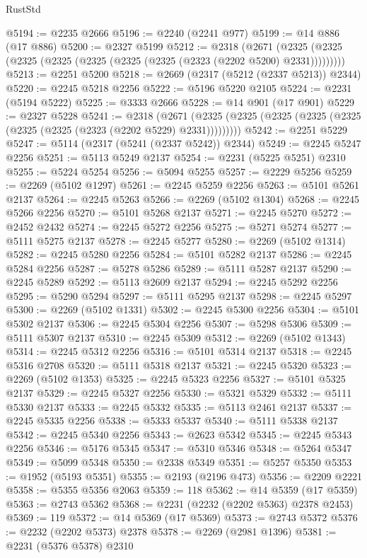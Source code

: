 \begin{lexlean}{RustStd}
\begin{coremodule}
@5194 := @2235 @2666
@5196 := @2240 (@2241 @977)
@5199 := @14 @886 (@17 @886)
@5200 := @2327 @5199
@5212 := @2318
    (@2671 (@2325 (@2325 (@2325 (@2325 (@2325 (@2325 (@2325 (@2323 (@2202 @5200) @2331)))))))))
@5213 := @2251 @5200
@5218 := @2669 (@2317 (@5212 (@2337 @5213)) @2344)
@5220 := @2245 @5218 @2256
@5222 := @5196 @5220 @2105
@5224 := @2231 (@5194 @5222)
@5225 := @3333 @2666
@5228 := @14 @901 (@17 @901)
@5229 := @2327 @5228
@5241 := @2318
    (@2671 (@2325 (@2325 (@2325 (@2325 (@2325 (@2325 (@2325 (@2323 (@2202 @5229) @2331)))))))))
@5242 := @2251 @5229
@5247 := @5114 (@2317 (@5241 (@2337 @5242)) @2344)
@5249 := @2245 @5247 @2256
@5251 := @5113 @5249 @2137
@5254 := @2231 (@5225 @5251) @2310
@5255 := @5224 @5254
@5256 := @5094 @5255
@5257 := @2229 @5256
@5259 := @2269 (@5102 @1297)
@5261 := @2245 @5259 @2256
@5263 := @5101 @5261 @2137
@5264 := @2245 @5263
@5266 := @2269 (@5102 @1304)
@5268 := @2245 @5266 @2256
@5270 := @5101 @5268 @2137
@5271 := @2245 @5270
@5272 := @2452 @2432
@5274 := @2245 @5272 @2256
@5275 := @5271 @5274
@5277 := @5111 @5275 @2137
@5278 := @2245 @5277
@5280 := @2269 (@5102 @1314)
@5282 := @2245 @5280 @2256
@5284 := @5101 @5282 @2137
@5286 := @2245 @5284 @2256
@5287 := @5278 @5286
@5289 := @5111 @5287 @2137
@5290 := @2245 @5289
@5292 := @5113 @2609 @2137
@5294 := @2245 @5292 @2256
@5295 := @5290 @5294
@5297 := @5111 @5295 @2137
@5298 := @2245 @5297
@5300 := @2269 (@5102 @1331)
@5302 := @2245 @5300 @2256
@5304 := @5101 @5302 @2137
@5306 := @2245 @5304 @2256
@5307 := @5298 @5306
@5309 := @5111 @5307 @2137
@5310 := @2245 @5309
@5312 := @2269 (@5102 @1343)
@5314 := @2245 @5312 @2256
@5316 := @5101 @5314 @2137
@5318 := @2245 @5316 @2708
@5320 := @5111 @5318 @2137
@5321 := @2245 @5320
@5323 := @2269 (@5102 @1353)
@5325 := @2245 @5323 @2256
@5327 := @5101 @5325 @2137
@5329 := @2245 @5327 @2256
@5330 := @5321 @5329
@5332 := @5111 @5330 @2137
@5333 := @2245 @5332
@5335 := @5113 @2461 @2137
@5337 := @2245 @5335 @2256
@5338 := @5333 @5337
@5340 := @5111 @5338 @2137
@5342 := @2245 @5340 @2256
@5343 := @2623 @5342
@5345 := @2245 @5343 @2256
@5346 := @5176 @5345
@5347 := @5310 @5346
@5348 := @5264 @5347
@5349 := @5099 @5348
@5350 := @2338 @5349
@5351 := @5257 @5350
@5353 := @1952 (@5193 @5351)
@5355 := @2193 (@2196 @473)
@5356 := @2209 @2221
@5358 := @5355 @5356 @2063
@5359 := 118
@5362 := @14 @5359 (@17 @5359)
@5363 := @2743 @5362
@5368 := @2231 (@2232 (@2202 @5363) @2378 @2453)
@5369 := 119
@5372 := @14 @5369 (@17 @5369)
@5373 := @2743 @5372
@5376 := @2232 (@2202 @5373) @2378
@5378 := @2269 (@2981 @1396)
@5381 := @2231 (@5376 @5378) @2310

\end{coremodule}
\end{lexlean}
